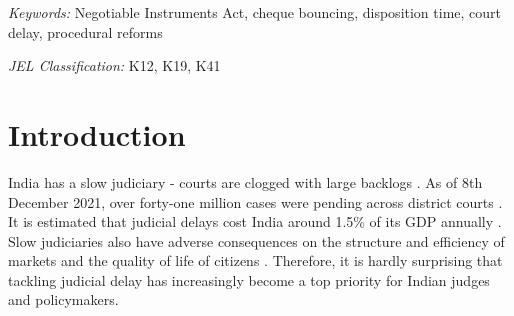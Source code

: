\documentclass[12pt,a4paper]{article}
\begin{document}
	\textit{Keywords: } Negotiable Instruments Act, cheque bouncing, disposition time, court delay, procedural reforms
	
	\textit{JEL Classification:} K12, K19, K41  
	
	\newpage
	\tableofcontents
	
	
	
	\newpage
	\section{Introduction}
	\label{sec:introduction}

	India has a slow judiciary - courts are clogged with large backlogs \autocite{moog1992delays, debroy2008justice, dutta2019modernise}. As of 8th December 2021, over forty-one million cases were pending across district courts \autocite{njdg2021}. It is estimated that judicial delays cost India around 1.5\% of its GDP annually \autocite{dey2016_cost}. Slow judiciaries also have adverse consequences on the structure and efficiency of markets and the quality of life of citizens \autocite{world2004world, chemin2007impact, rao2020institutional}. Therefore, it is hardly surprising that tackling judicial delay has increasingly become a top priority for Indian judges and policymakers.
	
	
	
\end{document}
